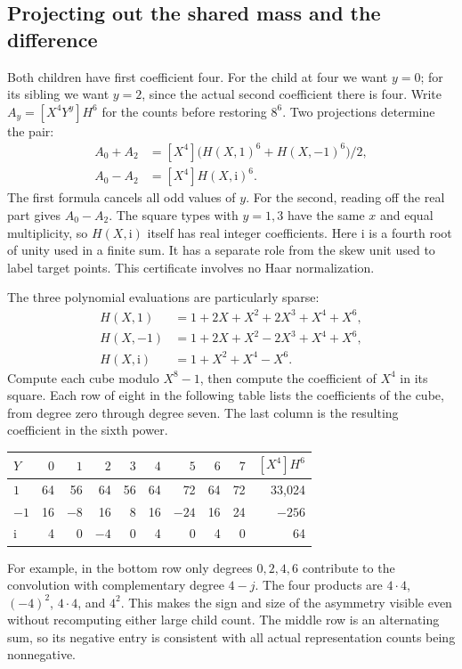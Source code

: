 \documentclass[12pt,letterpaper]{article}
\begin{document}
\subsection{Projecting out the shared mass and the difference}
Both children have first coefficient four. For the child at four we want $y=0$; for its sibling we want $y=2$, since the actual second coefficient there is four. Write $A_y=[X^4Y^y]H^6$ for the counts before restoring $8^6$. Two projections determine the pair:
\begin{align*}
 A_0+A_2&=[X^4]\big(H(X,1)^6+H(X,-1)^6\big)/2,\\
 A_0-A_2&=[X^4]H(X,\mathrm{i})^6 .
\end{align*}
The first formula cancels all odd values of $y$. For the second, reading off the real part gives $A_0-A_2$. The square types with $y=1,3$ have the same $x$ and equal multiplicity, so $H(X,\mathrm{i})$ itself has real integer coefficients. Here $\mathrm{i}$ is a fourth root of unity used in a finite sum. It has a separate role from the skew unit used to label target points. This certificate involves no Haar normalization.

The three polynomial evaluations are particularly sparse:
\begin{align*}
H(X,1)&=1+2X+X^2+2X^3+X^4+X^6,\\
H(X,-1)&=1+2X+X^2-2X^3+X^4+X^6,\\
H(X,\mathrm{i})&=1+X^2+X^4-X^6 .
\end{align*}
Compute each cube modulo $X^8-1$, then compute the coefficient of $X^4$ in its square. Each row of eight in the following table lists the coefficients of the cube, from degree zero through degree seven. The last column is the resulting coefficient in the sixth power.
\begin{center}\small\begin{tabular}{@{}lrrrrrrrrr@{}}\toprule
$Y$ & $0$ & $1$ & $2$ & $3$ & $4$ & $5$ & $6$ & $7$ & $[X^4]H^6$\\\midrule
$1$ &64&56&64&56&64&72&64&72&33,024\\
$-1$ &16&$-8$&16&8&16&$-24$&16&24&$-256$\\
$\mathrm{i}$ &4&0&$-4$&0&4&0&4&0&64\\\bottomrule
\end{tabular}\end{center}
For example, in the bottom row only degrees $0,2,4,6$ contribute to the convolution with complementary degree $4-j$. The four products are $4\cdot4$, $(-4)^2$, $4\cdot4$, and $4^2$. This makes the sign and size of the asymmetry visible even without recomputing either large child count. The middle row is an alternating sum, so its negative entry is consistent with all actual representation counts being nonnegative.
\end{document}
